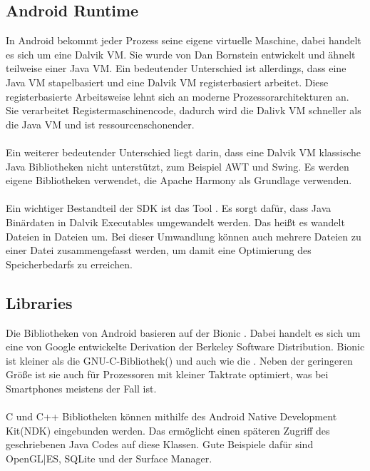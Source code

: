 \subsection{Android Runtime}
In Android bekommt jeder Prozess seine eigene virtuelle Maschine, dabei handelt es sich um eine Dalvik VM. Sie wurde von Dan Bornstein entwickelt und ähnelt teilweise einer Java VM. Ein bedeutender Unterschied ist allerdings, dass eine Java VM stapelbasiert und eine Dalvik VM registerbasiert arbeitet. Diese registerbasierte Arbeitsweise lehnt sich an moderne Prozessorarchitekturen an. Sie verarbeitet Registermaschinencode, dadurch wird die Dalivk VM schneller als die Java VM und ist ressourcenschonender.\cite{20}
\\
\\
Ein weiterer bedeutender Unterschied liegt darin, dass eine Dalvik VM klassische Java Bibliotheken nicht unterstützt, zum Beispiel AWT und Swing. Es werden eigene Bibliotheken verwendet, die Apache Harmony als Grundlage verwenden.\cite{20}
\\
\\
Ein wichtiger Bestandteil der SDK ist das Tool . Es sorgt dafür, dass Java Binärdaten in Dalvik Executables umgewandelt werden. Das heißt es wandelt  Dateien in  Dateien um. Bei dieser Umwandlung können auch mehrere  Dateien zu einer  Datei zusammengefasst werden, um damit eine Optimierung des Speicherbedarfs zu erreichen.\cite{19}\cite{20}


\subsection{Libraries}
Die Bibliotheken von Android basieren auf der Bionic . Dabei handelt es sich um eine von Google entwickelte Derivation der Berkeley Software Distribution. Bionic ist kleiner als die GNU-C-Bibliothek() und auch wie die . Neben der geringeren Größe ist sie auch für Prozessoren mit kleiner Taktrate optimiert, was bei Smartphones meistens der Fall ist.\cite{19}
\\
\\
C und C++ Bibliotheken können mithilfe des Android Native Development Kit(NDK) eingebunden werden. Das ermöglicht einen späteren Zugriff des geschriebenen Java Codes auf diese Klassen. Gute Beispiele dafür sind OpenGL|ES, SQLite und der Surface Manager.\cite{19}


